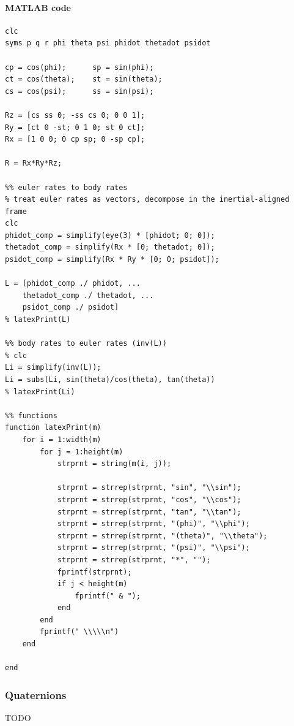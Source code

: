 \documentclass[a4paper,12pt]{article}
\begin{document}
\paragraph{MATLAB code}
\begin{verbatim}
clc
syms p q r phi theta psi phidot thetadot psidot

cp = cos(phi);      sp = sin(phi);
ct = cos(theta);    st = sin(theta);
cs = cos(psi);      ss = sin(psi);

Rz = [cs ss 0; -ss cs 0; 0 0 1];
Ry = [ct 0 -st; 0 1 0; st 0 ct];
Rx = [1 0 0; 0 cp sp; 0 -sp cp];

R = Rx*Ry*Rz;

%% euler rates to body rates
% treat euler rates as vectors, decompose in the inertial-aligned frame
clc
phidot_comp = simplify(eye(3) * [phidot; 0; 0]);
thetadot_comp = simplify(Rx * [0; thetadot; 0]);
psidot_comp = simplify(Rx * Ry * [0; 0; psidot]);

L = [phidot_comp ./ phidot, ...
    thetadot_comp ./ thetadot, ...
    psidot_comp ./ psidot]
% latexPrint(L)

%% body rates to euler rates (inv(L))
% clc
Li = simplify(inv(L));
Li = subs(Li, sin(theta)/cos(theta), tan(theta))
% latexPrint(Li)

%% functions
function latexPrint(m)
    for i = 1:width(m)
        for j = 1:height(m)
            strprnt = string(m(i, j));

            strprnt = strrep(strprnt, "sin", "\\sin");
            strprnt = strrep(strprnt, "cos", "\\cos");
            strprnt = strrep(strprnt, "tan", "\\tan");
            strprnt = strrep(strprnt, "(phi)", "\\phi");
            strprnt = strrep(strprnt, "(theta)", "\\theta");
            strprnt = strrep(strprnt, "(psi)", "\\psi");
            strprnt = strrep(strprnt, "*", "");
            fprintf(strprnt);
            if j < height(m)
                fprintf(" & ");
            end
        end
        fprintf(" \\\\\n")
    end

end
\end{verbatim}

\subsubsection{Quaternions}
TODO
\end{document}
